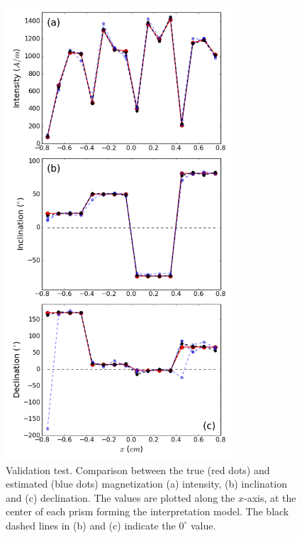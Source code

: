 \documentclass[draft,gc]{agutex}
\begin{document}
 \begin{figure}
 \noindent \includegraphics[width=20pc]{Figs/Fig6_LQ.png}
 \caption{Validation test. Comparison between the true (red dots)
 and estimated (blue dots) magnetization (a) intensity, (b) inclination 
 and (c) declination.
 The values are plotted along the $x$-axis, at the center of each 
 prism forming the interpretation model.
 The black dashed lines in (b) and (c) indicate the $0^{\circ}$ value.}
 \label{fig:estimate-validation}
 \end{figure}
 
\end{document}
